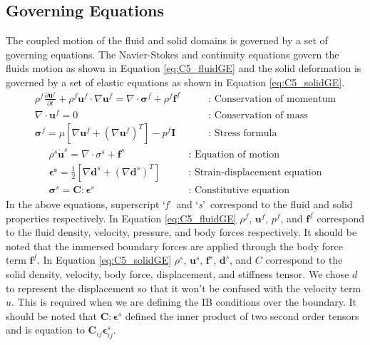 \subsection{Governing Equations}
The coupled motion of the fluid and solid domains is governed by a set of governing equations. The Navier-Stokes and continuity equations govern the fluids motion as shown in Equation \eqref{eq:C5_fluidGE} and the solid deformation is governed by a set of elastic equations as shown in Equation \eqref{eq:C5_solidGE}.
%
\begin{subequations}\label{eq:C5_fluidGE}
\begin{align}
	\rho^f \frac{\partial \mathbf{u}^f}{\partial t} + 
	\rho^f \mathbf{u}^f \cdot \nabla \mathbf{u}^f = 
	\nabla \cdot \mathbf{\sigma}^f +
	\rho^f \mathbf{f}^f
	\quad \quad &\text{: Conservation of momentum}
	\\
	\nabla \cdot \mathbf{u}^f = 0
	\quad \quad &\text{: Conservation of mass}
	\\
	\mathbf{\sigma}^f = 
	\mu \left[ \nabla \mathbf{u}^f + \left( \nabla \mathbf{u}^f \right)^T \right] - 
	p^f \mathbf{I}
	\quad \quad &\text{: Stress formula}
\end{align}
\end{subequations}
%
\begin{subequations}\label{eq:C5_solidGE}
\begin{align}
	\rho^s \dot{\mathbf{u}}^s = 
	\nabla \cdot \sigma^s + \mathbf{f}^s
	\quad \quad &\text{: Equation of motion}
	\\
	\mathbf{\epsilon^s} = \frac{1}{2}
	                                 \left[ \nabla \mathbf{d}^s + \left( \nabla \mathbf{d}^s \right)^T \right]
	\quad \quad &\text{: Strain-displacement equation}
	\\
	\mathbf{\sigma}^s = \mathbf{C} : \mathbf{\epsilon}^s
	\quad \quad &\text{: Constitutive equation}
\end{align}
\end{subequations}
%
In the above equations, superscript \lq\emph{f}\rq\ and \lq\emph{s}\rq\ correspond to the fluid and solid properties respectively. In Equation \eqref{eq:C5_fluidGE} $\rho^f$, $\mathbf{u}^f$, $p^f$, and $\mathbf{f}^f$ correspond to the fluid density, velocity, pressure, and body forces respectively. It should be noted that the immersed boundary forces are applied through the body force term $\mathbf{f}^f$. In Equation \eqref{eq:C5_solidGE} $\rho^s$, $\mathbf{u}^s$, $\mathbf{f}^s$, $\mathbf{d}^s$, and $C$ correspond to the solid density, velocity, body force, displacement, and stiffness tensor. We chose $d$ to represent the displacement so that it won't be confused with the velocity term $u$. This is required when we are defining the IB conditions over the boundary. It should be noted that $\mathbf{C} : \mathbf{\epsilon}^s$ defined the inner product of two second order tensors and is equation to $\mathbf{C}_{ij} \mathbf{\epsilon}_{ij}^s$.


